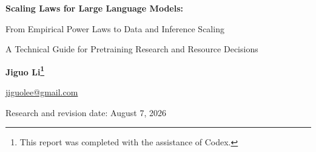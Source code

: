 \documentclass[UTF8,10pt,a4paper,fontset=none]{ctexart}
\renewcommand{\abstractname}{Abstract}
\renewcommand{\contentsname}{Contents}
\renewcommand{\figurename}{Figure}
\renewcommand{\tablename}{Table}
\renewcommand{\refname}{References}
\renewcommand{\appendixname}{Appendix}
\def\BilingualTocExtension{entoc}
\newcommand{\BilingualUseEnglishToc}{\gdef\BilingualTocExtension{entoc}}
\def\BilingualAnchorPrefix{en}
\begin{document}
\renewcommand{\abstractname}{Abstract}
\renewcommand{\contentsname}{Contents}
\renewcommand{\figurename}{Figure}
\renewcommand{\tablename}{Table}
\renewcommand{\refname}{References}
\renewcommand{\appendixname}{Appendix}
\BilingualUseEnglishToc
\renewcommand*{\theHsection}{en.\arabic{section}}
\renewcommand*{\theHsubsection}{en.\arabic{section}.\arabic{subsection}}
\renewcommand*{\theHsubsubsection}{en.\arabic{section}.\arabic{subsection}.\arabic{subsubsection}}
\renewcommand*{\theHequation}{en.\arabic{equation}}
\renewcommand*{\theHfigure}{en.\arabic{figure}}
\renewcommand*{\theHtable}{en.\arabic{table}}
\gdef\BilingualAnchorPrefix{en}
\markboth{}{}
\begin{center}
  {\sffamily\bfseries{}\color{deepblue}
Scaling Laws for Large Language Models:\par From Empirical Power Laws to Data and Inference Scaling}

  \vspace{0.6em}
{\sffamily A Technical Guide for Pretraining Research and Resource Decisions}

  \vspace{0.55em}
{\normalsize\textbf{Jiguo Li\footnote{This report was completed with the assistance of Codex.}}}\par

  \vspace{0.2em}
  {\small\href{mailto:jiguolee@gmail.com}{jiguolee@gmail.com}}\par

  \vspace{0.3em}
{\small\sffamily Research and revision date: August 7, 2026 }
\end{center}
\end{document}
